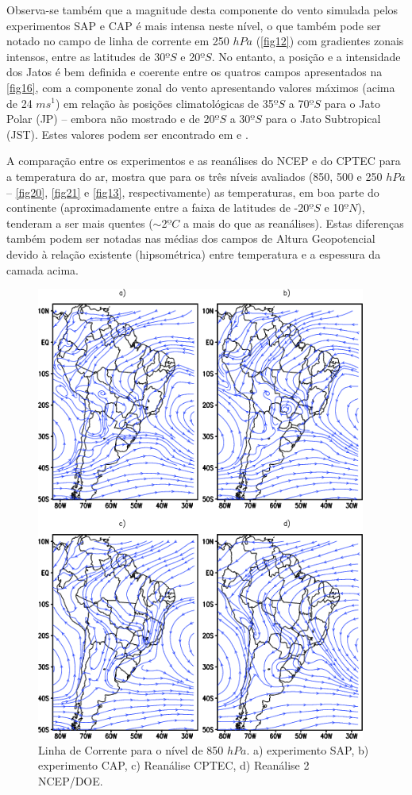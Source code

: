 Observa-se também que a magnitude desta componente do vento simulada pelos experimentos SAP e CAP é mais intensa neste nível, o que também pode ser notado no campo de linha de corrente em 250 $hPa$ (\autoref{fig12}) com gradientes zonais intensos, entre as latitudes de 30$ºS$ e 20$ºS$. No entanto, a posição e a intensidade dos Jatos é bem definida e coerente entre os quatros campos apresentados na \autoref{fig16}, com a componente zonal do vento apresentando valores máximos (acima de 24 $ms^{1}$) em relação às posições climatológicas de 35$ºS$ a 70$ºS$ para o Jato Polar (JP) – embora não mostrado e de 20$ºS$ a 30$ºS$ para o Jato Subtropical (JST). Estes valores podem ser encontrado em  e . 

A comparação entre os experimentos e as reanálises do NCEP e do CPTEC para a temperatura do ar, mostra que para os três níveis avaliados (850, 500 e 250 $hPa$ – \autoref{fig20}, \autoref{fig21} e \autoref{fig13}, respectivamente) as temperaturas, em boa parte do continente (aproximadamente entre a faixa de latitudes de -20$ºS$ e 10$ºN$), tenderam a ser mais quentes ($\sim$2$ºC$ a mais do que as reanálises). Estas diferenças também podem ser notadas nas médias dos campos de Altura Geopotencial devido à relação existente (hipsométrica) entre temperatura e a espessura da camada acima.

\begin{figure}[!hbp]
\centering
\includegraphics[height=15cm]{./figs/media_corrente_anl_850hPa.png}
\caption{Linha de Corrente para o nível de 850 $hPa$. a) experimento SAP, b) experimento CAP, c) Reanálise CPTEC, d) Reanálise 2 NCEP/DOE.}
\label{fig10}
\end{figure}

